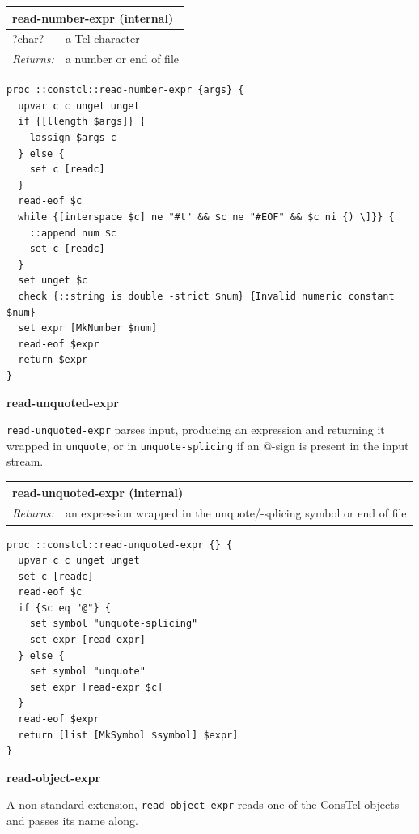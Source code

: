 \documentclass[twoside,9pt]{report}
\begin{document}
\begin{tabular}{ |l l| }
\hline
\multicolumn{2}{|l|}{read-number-expr (internal)} \\
\hline
?char? & a Tcl character \\
\textit{Returns:} & a number or end of file \\
\hline
\end{tabular}

\noindent\makebox[\linewidth]{\rule{\linewidth}{0.4pt}}
\begin{lstlisting}
proc ::constcl::read-number-expr {args} {
  upvar c c unget unget
  if {[llength $args]} {
    lassign $args c
  } else {
    set c [readc]
  }
  read-eof $c
  while {[interspace $c] ne "#t" && $c ne "#EOF" && $c ni {) \]}} {
    ::append num $c
    set c [readc]
  }
  set unget $c
  check {::string is double -strict $num} {Invalid numeric constant $num}
  set expr [MkNumber $num]
  read-eof $expr
  return $expr
}
\end{lstlisting}
\noindent\makebox[\linewidth]{\rule{\linewidth}{0.4pt}}

\textbf{read-unquoted-expr}


\texttt{read-unquoted-expr} parses input, producing an expression and returning it wrapped in \texttt{unquote}, or in \texttt{unquote-splicing} if an @-sign is present in the input stream.

\begin{tabular}{ |l l| }
\hline
\multicolumn{2}{|l|}{read-unquoted-expr (internal)} \\
\hline
\textit{Returns:} & an expression wrapped in the unquote/-splicing symbol or end of file \\
\hline
\end{tabular}

\noindent\makebox[\linewidth]{\rule{\linewidth}{0.4pt}}
\begin{lstlisting}
proc ::constcl::read-unquoted-expr {} {
  upvar c c unget unget
  set c [readc]
  read-eof $c
  if {$c eq "@"} {
    set symbol "unquote-splicing"
    set expr [read-expr]
  } else {
    set symbol "unquote"
    set expr [read-expr $c]
  }
  read-eof $expr
  return [list [MkSymbol $symbol] $expr]
}
\end{lstlisting}
\noindent\makebox[\linewidth]{\rule{\linewidth}{0.4pt}}

\textbf{read-object-expr}


A non-standard extension, \texttt{read-object-expr} reads one of the ConsTcl objects and passes its name along.
\end{document}
